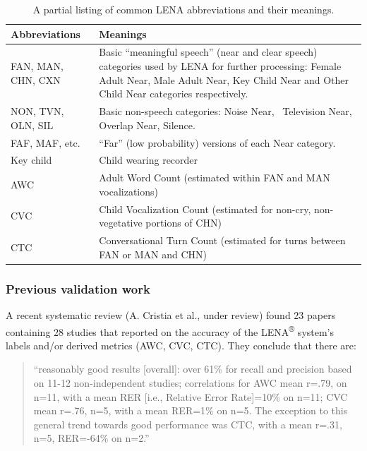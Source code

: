 \documentclass[english,floatsintext,man]{apa6}
\begin{document}
\begin{table}[t]

\caption{\label{tab:tab-abb}A partial listing of common LENA abbreviations and their meanings.}
\centering
\begin{tabular}{>{\raggedright\arraybackslash}p{12em}>{\raggedright\arraybackslash}p{28em}}
\toprule
Abbreviations & Meanings\\
\midrule
FAN, MAN, CHN, CXN & Basic “meaningful speech” (near and clear speech) categories used by LENA for further processing: Female Adult Near, Male Adult Near, Key Child Near and Other Child Near categories respectively.\\
NON, TVN, OLN, SIL & Basic non-speech categories: Noise Near,  Television Near, Overlap Near, Silence.\\
FAF, MAF, etc. & “Far” (low probability) versions of each Near category.\\
Key child & Child wearing recorder\\
AWC & Adult Word Count (estimated within FAN and MAN vocalizations)\\
\addlinespace
CVC & Child Vocalization Count (estimated for non-cry, non-vegetative portions of CHN)\\
CTC & Conversational Turn Count (estimated for turns between FAN or MAN and CHN)\\
\bottomrule
\end{tabular}
\end{table}

\subsubsection{Previous validation work}\label{previous-validation-work}

A recent systematic review (A. Cristia et al., under review) found 23
papers containing 28 studies that reported on the accuracy of the
LENA\textsuperscript{®} system's labels and/or derived metrics (AWC,
CVC, CTC). They conclude that there are:

\begin{quote}
\enquote{reasonably good results {[}overall{]}: over 61\% for recall and
precision based on 11-12 non-independent studies; correlations for AWC
mean r=.79, on n=11, with a mean RER {[}i.e., Relative Error
Rate{]}=10\% on n=11; CVC mean r=.76, n=5, with a mean RER=1\% on n=5.
The exception to this general trend towards good performance was CTC,
with a mean r=.31, n=5, RER=-64\% on n=2.}
\end{quote}
\end{document}
